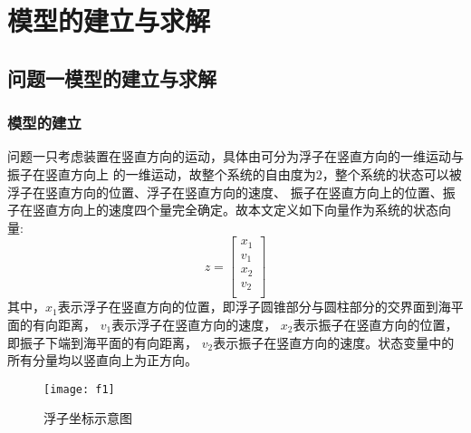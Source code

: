 \documentclass[withoutpreface,bwprint]{cumcmthesis} %
\begin{document}
    \section{模型的建立与求解}
    \subsection{问题一模型的建立与求解}
    \subsubsection{模型的建立}
    问题一只考虑装置在竖直方向的运动，具体由可分为浮子在竖直方向的一维运动与振子在竖直方向上
    的一维运动，故整个系统的自由度为$2$，整个系统的状态可以被浮子在竖直方向的位置、浮子在竖直方向的速度、
    振子在竖直方向上的位置、振子在竖直方向上的速度四个量完全确定。故本文定义如下向量作为系统的状态向量:
    $$
    z = \left [
        \begin{array}{c}
        x_1 \\
        v_1 \\
        x_2 \\            
        v_2 \\
        \end{array} \right ]
    $$
    其中，$ x_1 $表示浮子在竖直方向的位置，即浮子圆锥部分与圆柱部分的交界面到海平面的有向距离，
    $ v_1 $表示浮子在竖直方向的速度，
    $ x_2 $表示振子在竖直方向的位置，即振子下端到海平面的有向距离，
    $ v_2 $表示振子在竖直方向的速度。状态变量中的所有分量均以竖直向上为正方向。

    \begin{figure}[H]
        \centering
        \texttt{[image: f1]}
        \caption{浮子坐标示意图}
        \label{fig:coordinate}
    \end{figure}
    
\end{document}
